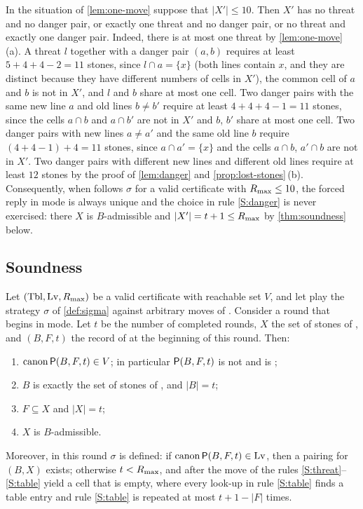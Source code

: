 \begin{remark}\label{rem:one-event}
In the situation of \cref{lem:one-move} suppose that $|X'|\le 10$. Then $X'$ has no threat and no danger
pair, or exactly one threat and no danger pair, or no threat and exactly one danger pair. Indeed, there is
at most one threat by \cref{lem:one-move}\,(a). A threat $l$ together with a danger pair $(a,b)$
requires at least $5+4+4-2=11$ stones, since $l\cap a=\{x\}$ (both lines contain $x$, and they are
distinct because they have different numbers of cells in $X'$), the common cell of $a$ and $b$ is not in
$X'$, and $l$ and $b$ share at most one cell. Two danger pairs with the same new line $a$ and old lines
$b\ne b'$ require at least $4+4+4-1=11$ stones, since the cells $a\cap b$ and $a\cap b'$ are not in $X'$ and
$b$, $b'$ share at most one cell. Two danger pairs with new lines $a\ne a'$ and the same old line $b$ require
$(4+4-1)+4=11$ stones, since $a\cap a'=\{x\}$ and the cells $a\cap b$, $a'\cap b$ are not in $X'$. Two danger
pairs with different new lines and different old lines require at least $12$ stones by the proof of
\cref{lem:danger} and \cref{prop:lost-stones}\,(b). Consequently, when \Breaker{} follows $\sigma$ for a valid certificate with $R_{\max}\le 10$, the forced reply
in \TABLE{} mode is always unique and the choice in rule \ref{S:danger} is never exercised: there $X$ is
$B$-admissible and $|X'|=t+1\le R_{\max}$ by \cref{thm:soundness} below.
\end{remark}

\subsection{Soundness}\label{sec:soundness}

\begin{theorem}\label{thm:soundness}
Let $(\mathrm{Tbl},\mathrm{Lv},R_{\max})$ be a valid certificate with reachable set $V$, and let \Breaker{} play the strategy
$\sigma$ of \cref{def:sigma} against arbitrary moves of \Maker. Consider a round that begins in
\TABLE{} mode. Let $t$ be the number of completed rounds, $X$ the set of stones of \Maker, and $(B,F,t)$ the
record of \Breaker{} at the beginning of this round. Then:
\begin{enumerate}[label=\textup{(I\arabic*)},leftmargin=3em]
\item\label{I:V} $\operatorname{canon}\mathsf{P}(B,F,t)\in V$; in particular $\mathsf{P}(B,F,t)$ is not \VOID{} and is \WON;
\item\label{I:B} $B$ is exactly the set of stones of \Breaker, and $|B|=t$;
\item\label{I:F} $F\subseteq X$ and $|X|=t$;
\item\label{I:adm} $X$ is $B$-admissible.
\end{enumerate}
Moreover, in this round $\sigma$ is defined: if $\operatorname{canon}\mathsf{P}(B,F,t)\in\mathrm{Lv}$, then a pairing for $(B,X)$ exists;
otherwise $t<R_{\max}$, and after the move of \Maker{} the rules \ref{S:threat}--\ref{S:table} yield a cell that
is empty, where every look-up in rule \ref{S:table} finds a table entry and rule \ref{S:table} is repeated
at most $t+1-|F|$ times.
\end{theorem}

